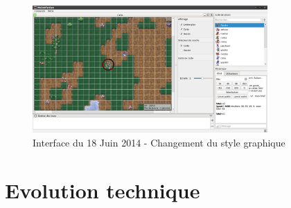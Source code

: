 \begin{figure}[h!]
	\centering
	\includegraphics[width=0.8\textwidth]{img/gui_history/2014_06_18_screen.png}
	\caption{Interface du 18 Juin 2014 - Changement du style graphique}
\end{figure}

\section{Evolution technique}

